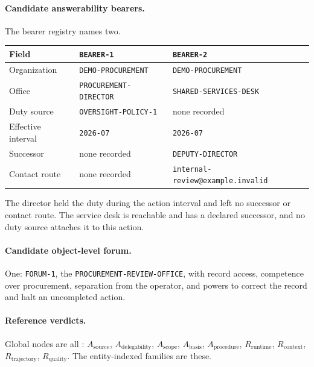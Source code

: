 \paragraph{Candidate answerability bearers.}
The bearer registry names two.

\begin{center}
\small
\begin{tabular}{lll}
\toprule
Field & \texttt{BEARER-1} & \texttt{BEARER-2} \\
\midrule
Organization & \texttt{DEMO-PROCUREMENT} & \texttt{DEMO-PROCUREMENT} \\
Office & \texttt{PROCUREMENT-DIRECTOR} & \texttt{SHARED-SERVICES-DESK} \\
Duty source & \texttt{OVERSIGHT-POLICY-1} & none recorded \\
Effective interval & \texttt{2026-07} & \texttt{2026-07} \\
Successor & none recorded & \texttt{DEPUTY-DIRECTOR} \\
Contact route & none recorded & \texttt{internal-review@example.invalid} \\
\bottomrule
\end{tabular}
\end{center}

The director held the duty during the action interval and left no successor or contact route. The service desk is reachable and has a declared successor, and no duty source attaches it to this action.

\paragraph{Candidate object-level forum.}
One: \texttt{FORUM-1}, the \texttt{PROCUREMENT-REVIEW-OFFICE}, with record access, competence over procurement, separation from the operator, and powers to correct the record and halt an uncompleted action.

\paragraph{Reference verdicts.}
Global nodes are all : \(A_{\mathrm{source}}\), \(A_{\mathrm{delegability}}\), \(A_{\mathrm{scope}}\), \(A_{\mathrm{basis}}\), \(A_{\mathrm{procedure}}\), \(R_{\mathrm{runtime}}\), \(R_{\mathrm{context}}\), \(R_{\mathrm{trajectory}}\), \(R_{\mathrm{quality}}\). The entity-indexed families are these.

